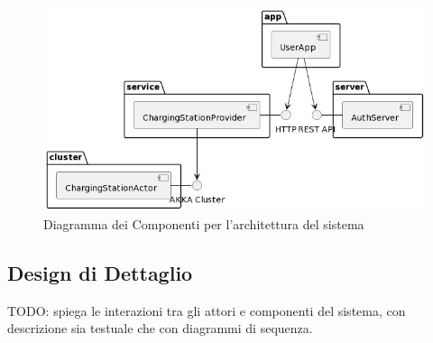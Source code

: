 \begin{figure}[htbp]
    \centering
    \includegraphics[width=\textwidth]{images/architecture.png}
    \caption{Diagramma dei Componenti per l'architettura del sistema}
    \label{fig:architecture}
\end{figure}

\subsection*{Design di Dettaglio}
TODO: spiega le interazioni tra gli attori e componenti del sistema, con descrizione sia testuale che con diagrammi di sequenza.\\







\newpage